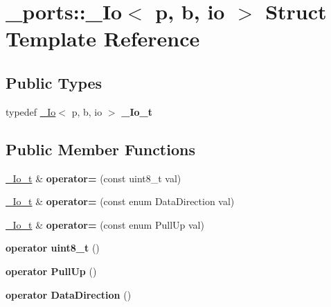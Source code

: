\hypertarget{struct__ports_1_1__Io}{}\section{\+\_\+ports\+:\+:\+\_\+\+Io$<$ p, b, io $>$ Struct Template Reference}
\label{struct__ports_1_1__Io}
\subsection*{Public Types}
\begin{DoxyCompactItemize}
\item 
typedef \hyperlink{struct__ports_1_1__Io}{\+\_\+\+Io}$<$ p, b, io $>$ {\bfseries \+\_\+\+Io\+\_\+t}\hypertarget{struct__ports_1_1__Io_a922975a326bf5d43186e4b348353a380}{}\label{struct__ports_1_1__Io_a922975a326bf5d43186e4b348353a380}

\end{DoxyCompactItemize}
\subsection*{Public Member Functions}
\begin{DoxyCompactItemize}
\item 
\hyperlink{struct__ports_1_1__Io}{\+\_\+\+Io\+\_\+t} \& {\bfseries operator=} (const uint8\+\_\+t val)\hypertarget{struct__ports_1_1__Io_a4fba5d916f26dc4181e0bf704cb735f8}{}\label{struct__ports_1_1__Io_a4fba5d916f26dc4181e0bf704cb735f8}

\item 
\hyperlink{struct__ports_1_1__Io}{\+\_\+\+Io\+\_\+t} \& {\bfseries operator=} (const enum Data\+Direction val)\hypertarget{struct__ports_1_1__Io_aadd51d148c18cd94892d32a0de22598d}{}\label{struct__ports_1_1__Io_aadd51d148c18cd94892d32a0de22598d}

\item 
\hyperlink{struct__ports_1_1__Io}{\+\_\+\+Io\+\_\+t} \& {\bfseries operator=} (const enum Pull\+Up val)\hypertarget{struct__ports_1_1__Io_a405acf002819c0d43febe61e84e447ed}{}\label{struct__ports_1_1__Io_a405acf002819c0d43febe61e84e447ed}

\item 
{\bfseries operator uint8\+\_\+t} ()\hypertarget{struct__ports_1_1__Io_a4c3f4efca085ea1cbe9702d7b5ca35cc}{}\label{struct__ports_1_1__Io_a4c3f4efca085ea1cbe9702d7b5ca35cc}

\item 
{\bfseries operator Pull\+Up} ()\hypertarget{struct__ports_1_1__Io_a8982086fcd02411455a675bc897d79d7}{}\label{struct__ports_1_1__Io_a8982086fcd02411455a675bc897d79d7}

\item 
{\bfseries operator Data\+Direction} ()\hypertarget{struct__ports_1_1__Io_aed95c288b86930b23a309790ce62d218}{}\label{struct__ports_1_1__Io_aed95c288b86930b23a309790ce62d218}

\end{DoxyCompactItemize}
